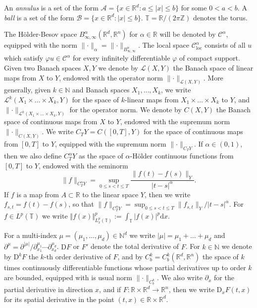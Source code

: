 \documentclass[11pt,a4paper]{article}
\newcommand{\cdummy}{\cdot}
\newcommand{\mathD}{\mathrm{D}}
\newcommand{\mathd}{\mathrm{d}}
\newcommand{\tmem}[1]{{\em #1\/}}
\newcommand{\tmtextit}[1]{{\itshape{#1}}}
\theoremstyle{remark}
\newcommand{\R}{\mathbb{R}}
\newcommand{\Z}{\mathbb{Z}}
\newcommand{\Lcal}{\mathcal{L}}
\newcommand{\CA}{\ensuremath{\mathscr{A}}}
\newcommand{\CB}{\ensuremath{\mathscr{B}}}
\newcommand{\CC}{\ensuremath{\mathscr{C}}}
\begin{document}
An \tmtextit{annulus} is a set of the form $\CA = \{ x \in \mathbb{R}^{d} :a \leqslant | x | \leqslant b \}$ for some $0<a<b$. A {\tmem{ball}} is a set of the form $\CB = \{ x \in \mathbb{R}^{d} : | x | \leqslant b \}$. $\mathbb{T}= \R / (2\pi \Z)$ denotes the torus.

The H\"older-Besov space $B^\alpha_{\infty, \infty}(\R^d, \R^n)$ for $\alpha \in \R$ will be denoted by $\CC^\alpha$, equipped with the norm $\lVert \cdot \rVert_{\alpha}= \lVert \cdot \rVert_{B^\alpha_{\infty,\infty}}$. The local space $\CC^\alpha_\mathrm{loc}$ consists of all $u$ which satisfy $\varphi u \in \CC^\alpha$ for every infinitely differentiable $\varphi$ of compact support. Given two Banach spaces $X,Y$ we denote by $\Lcal ( X,Y )$ the Banach space of linear maps from $X$ to $Y$, endowed with the operator norm $\lVert \cdummy \rVert_{\Lcal(X,Y)}$. More generally, given $k \in \mathbb{N}$ and Banach spaces $X_{1} , \ldots ,X_{k}$, we write $\Lcal^{k} ( X_{1}\times \ldots \times X_{k} ,Y )$ for the space of $k$-linear maps from $X_{1} \times \ldots \times X_{k}$ to $Y$, and $\lVert \cdummy \rVert_{\Lcal^{k} (X_{1} \times \ldots \times X_{k} ,Y )}$ for the operator norm. We denote by $C( X,Y )$ the Banach space of continuous maps from $X$ to $Y$, endowed with the supremum norm $\lVert \cdummy \rVert_{C ( X,Y )}$. We write $C_{T} Y=C ( [ 0,T ] ,Y )$ for the space of continuous maps from $[ 0,T ]$ to $Y$, equipped with the supremum norm $\lVert \cdummy \rVert_{C_{T} Y}$. If $\alpha \in ( 0,1 )$, then we also define $C^{\alpha}_{T} Y$ as the space of $\alpha$-H{\"o}lder continuous functions from $[ 0,T ]$ to $Y$, endowed with the seminorm
\[
   \| f \|_{C^{\alpha}_{T} Y} = \sup_{0 \leqslant s<t \leqslant T} \frac{\| f( t ) -f ( s ) \|_{Y}}{| t-s |^{\alpha}}.
\]
If $f$ is a map from $A \subset \R$ to the linear space $Y$, then we write $f_{s,t} = f(t) - f(s)$, so that $\| f \|_{C^\alpha_T Y} = \sup_{0 \leqslant s<t \leqslant T} \| f_{s,t} \|_{Y}/ | t-s |^{\alpha}$. For  $f \in L^p(\mathbb{T})$ we write $\Vert  f(x) \Vert ^p_{L^p_x (\mathbb{T} )} := \int_{\mathbb{T}} | f ( x )|^p \mathd x$.

For a multi-index $\mu = ( \mu_{1} , \ldots , \mu_{d} ) \in \mathbb{N}^{d}$ we write $| \mu | = \mu_{1} + \ldots + \mu_{d}$ and $\partial^{\mu} = \partial^{| \mu |} / \partial_{x_{1}}^{\mu_{1}} \cdots \partial_{x_{d}}^{\mu_{d}}$. %
$\mathD F$ or $F'$ denote the total derivative of $F$. For $k \in \mathbb{N}$ we denote by $\mathD^{k} F$ the $k$-th order derivative of $F$, and by $C^{k}_{b} =C^{k}_{b} (\mathbb{R}^{d} ,\mathbb{R}^{n} )$ the space of $k$ times continuously differentiable functions whose partial derivatives up to order $k$ are bounded, equipped with is usual norm $\lVert \cdot \rVert_{C^k_b}$. %
We also write $\partial_{x}$ for the partial derivative in direction $x$, and if $F\colon \mathbb{R} \times\mathbb{R}^{d} \rightarrow \mathbb{R}^{n}$, then we write $\mathD_{x} F(t,x)$ for its spatial derivative in the point $( t,x ) \in \mathbb{R} \times \mathbb{R}^{d}$.
\end{document}
